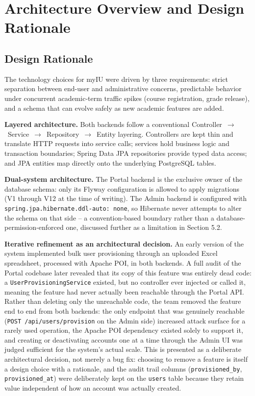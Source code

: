 \documentclass[12pt,a4paper]{report}
\begin{document}
\section{Architecture Overview and Design Rationale}

\subsection{Design Rationale}

The technology choices for myIU were driven by three requirements:
strict separation between end-user and administrative concerns,
predictable behavior under concurrent academic-term traffic spikes
(course registration, grade release), and a schema that can evolve
safely as new academic features are added.

\textbf{Layered architecture.} Both backends follow a conventional
Controller~$\rightarrow$~Service~$\rightarrow$~Repository~$\rightarrow$~Entity
layering. Controllers are kept thin and translate HTTP requests into
service calls; services hold business logic and transaction boundaries;
Spring Data JPA repositories provide typed data access; and JPA
entities map directly onto the underlying PostgreSQL tables.

\textbf{Dual-system architecture.} The Portal backend is the exclusive
owner of the database schema: only its Flyway configuration is allowed
to apply migrations (V1 through V12 at the time of writing). The Admin
backend is configured with \texttt{spring.jpa.hibernate.ddl-auto: none},
so Hibernate never attempts to alter the schema on that side -- a
convention-based boundary rather than a database-permission-enforced
one, discussed further as a limitation in Section 5.2.

\textbf{Iterative refinement as an architectural decision.} An early
version of the system implemented bulk user provisioning through an
uploaded Excel spreadsheet, processed with Apache POI, in both
backends. A full audit of the Portal codebase later revealed that its
copy of this feature was entirely dead code: a
\texttt{UserProvisioningService} existed, but no controller ever
injected or called it, meaning the feature had never actually been
reachable through the Portal API. Rather than deleting only the
unreachable code, the team removed the feature end to end from both
backends: the only endpoint that was genuinely reachable
(\texttt{POST /api/users/provision} on the Admin side) increased attack
surface for a rarely used operation, the Apache POI dependency existed
solely to support it, and creating or deactivating accounts one at a
time through the Admin UI was judged sufficient for the system's actual
scale. This is presented as a deliberate architectural decision, not
merely a bug fix: choosing to remove a feature is itself a design
choice with a rationale, and the audit trail columns
(\texttt{provisioned\_by}, \texttt{provisioned\_at}) were deliberately
kept on the \texttt{users} table because they retain value independent
of how an account was actually created.
\end{document}
